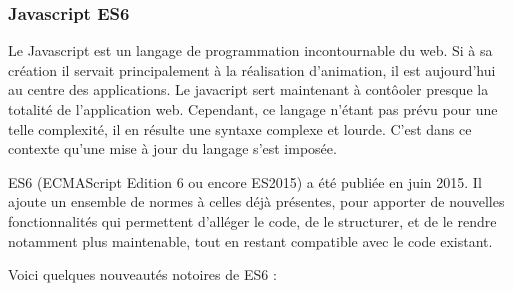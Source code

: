 \documentclass[12pt,a4paper]{article}
\begin{document}
  \subsubsection{Javascript ES6}\label{javascript-es6}

  \bigskip

  Le Javascript est un langage de programmation incontournable du web. Si
  à sa création il servait principalement à la réalisation d'animation, il
  est aujourd'hui au centre des applications. Le javacript sert maintenant
  à contôoler presque la totalité de l'application web. Cependant, ce
  langage n'étant pas prévu pour une telle complexité, il en résulte une
  syntaxe complexe et lourde. C'est dans ce contexte qu'une mise à jour du
  langage s'est imposée.

  \bigskip

  ES6 (ECMAScript Edition 6 ou encore ES2015) a été publiée en juin 2015.
  Il ajoute un ensemble de normes à celles déjà présentes, pour apporter
  de nouvelles fonctionnalités qui permettent d'alléger le code, de le
  structurer, et de le rendre notamment plus maintenable, tout en restant
  compatible avec le code existant.

  \bigskip

  Voici quelques nouveautés notoires de ES6 :
\end{document}
